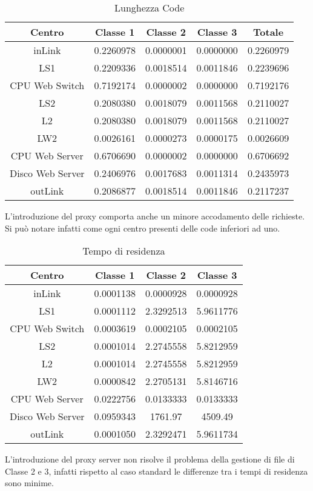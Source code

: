 \begin{table}[htbp]
\begin{center}
\begin{tabular}{|c|c|c|c|c|}
\hline
Centro	&Classe 1	&Classe 2	&Classe 3 &Totale\\
\hline
\hline
inLink & 0.2260978 & 0.0000001 & 0.0000000 & 0.2260979 \\ \hline
LS1 & 0.2209336 & 0.0018514 & 0.0011846 & 0.2239696 \\ \hline
CPU Web Switch & 0.7192174 & 0.0000002 & 0.0000000 & 0.7192176 \\ \hline
LS2 & 0.2080380 & 0.0018079 & 0.0011568 & 0.2110027 \\ \hline
L2 & 0.2080380 & 0.0018079 & 0.0011568 & 0.2110027 \\ \hline
LW2 & 0.0026161 & 0.0000273 & 0.0000175 & 0.0026609 \\ \hline
CPU Web Server & 0.6706690 & 0.0000002 & 0.0000000 & 0.6706692 \\ \hline
Disco Web Server & 0.2406976 & 0.0017683 & 0.0011314 & 0.2435973 \\ \hline
outLink & 0.2086877 & 0.0018514 & 0.0011846 & 0.2117237 \\ \hline
\end{tabular}
\end{center}
\caption{Lunghezza Code}
\label{lunghezzacode}
\end{table}
L'introduzione del proxy comporta anche un minore accodamento delle richieste. Si può notare infatti come ogni centro presenti delle code inferiori ad uno.
\begin{table}[htbp]
\begin{center}
\begin{tabular}{|c|c|c|c|}
\hline
Centro	&Classe 1	&Classe 2	&Classe 3 \\
\hline
\hline
inLink & 0.0001138 & 0.0000928 & 0.0000928 \\ \hline
LS1 & 0.0001112 & 2.3292513 & 5.9611776 \\ \hline
CPU Web Switch & 0.0003619 & 0.0002105 & 0.0002105 \\ \hline
LS2 & 0.0001014 & 2.2745558 & 5.8212959 \\ \hline
L2 & 0.0001014 & 2.2745558 & 5.8212959 \\ \hline
LW2 & 0.0000842 & 2.2705131 & 5.8146716 \\ \hline
CPU Web Server & 0.0222756 & 0.0133333 & 0.0133333 \\ \hline
Disco Web Server & 0.0959343 & 1761.97 & 4509.49 \\ \hline
outLink & 0.0001050 & 2.3292471 & 5.9611734 \\ \hline
\end{tabular}
\end{center}
\caption{Tempo di residenza}
\label{tempodiresidenza}
\end{table}
L'introduzione del proxy server non risolve il problema della gestione di file di Classe 2 e 3, infatti rispetto al caso standard le differenze tra i tempi di residenza sono minime.

